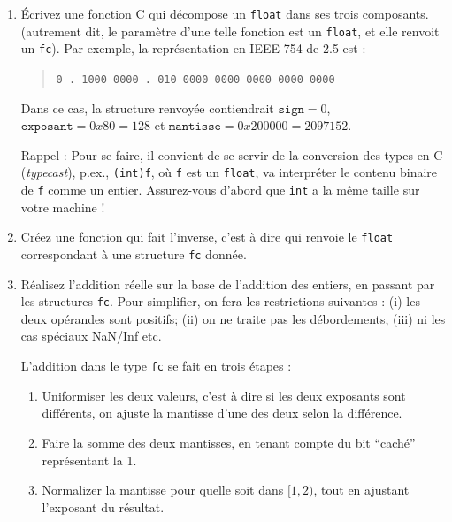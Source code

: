 \documentclass[11pt]{article}
\begin{document}
\begin{enumerate}
\item \'Ecrivez une fonction C qui d\'ecompose un \texttt{float}
  dans ses trois composants. (autrement dit, le param\`etre d'une telle
  fonction est un \texttt{float}, et elle renvoit un \texttt{fc}).
  Par exemple, la représentation en IEEE 754 de 2.5 est :
\begin{quote}
\verb+0 . 1000 0000 . 010 0000 0000 0000 0000 0000+
\end{quote}
Dans ce cas, la structure renvoy\'ee contiendrait $\mathtt{sign}=0$,
$\mathtt{exposant}=0x80=128$ et $\mathtt{mantisse}=0x200000=2097152$.

Rappel : Pour se faire, il convient de se servir de la conversion des
types en C (\emph{typecast}), p.ex., \texttt{(int)f}, o\`u \texttt{f}
est un \texttt{float}, va interpr\'eter le contenu binaire de \texttt{f} comme 
un entier. Assurez-vous d'abord que \texttt{int} a la m\^eme taille
sur votre machine !

\item Cr\'eez une fonction qui fait l'inverse, c'est \`a dire qui renvoie
  le \texttt{float} correspondant \`a une structure \texttt{fc} donn\'ee.

\item R\'ealisez l'addition r\'eelle sur la base de l'addition des entiers,
  en passant par les structures \texttt{fc}. Pour simplifier, on fera les
  restrictions suivantes : (i) les deux op\'erandes sont positifs; (ii)
  on ne traite pas les d\'ebordements, (iii) ni les cas sp\'eciaux NaN/Inf etc.

L'addition dans le type \texttt{fc} se fait en trois \'etapes :
\begin{enumerate}
\item Uniformiser les deux valeurs, c'est \`a dire si les deux exposants sont
  diff\'erents, on ajuste la mantisse d'une des deux selon la
  diff\'erence.
\item Faire la somme des deux mantisses, en tenant compte du bit ``cach\'e''
  repr\'esentant la 1.
\item Normalizer la mantisse pour quelle soit dans $[1,2)$, tout en ajustant
  l'exposant du r\'esultat.
\end{enumerate}

\end{enumerate}




\end{document}
